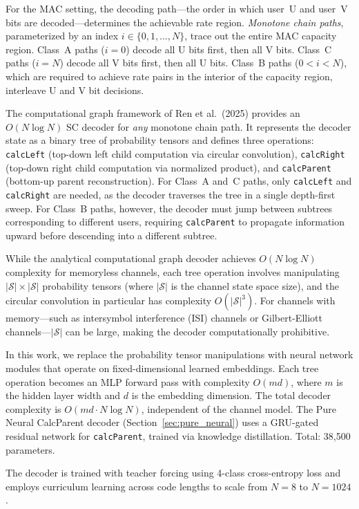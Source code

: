 \documentclass[11pt,a4paper]{article}
\begin{document}
For the MAC setting, the decoding path---the order in which user~U and user~V bits are decoded---determines the achievable rate region. \emph{Monotone chain paths}, parameterized by an index $i \in \{0, 1, \ldots, N\}$, trace out the entire MAC capacity region. Class~A paths ($i = 0$) decode all U bits first, then all V bits. Class~C paths ($i = N$) decode all V bits first, then all U bits. Class~B paths ($0 < i < N$), which are required to achieve rate pairs in the interior of the capacity region, interleave U and V bit decisions.

The computational graph framework of Ren et al.\ (2025) provides an $O(N \log N)$ SC decoder for \emph{any} monotone chain path. It represents the decoder state as a binary tree of probability tensors and defines three operations: \texttt{calcLeft} (top-down left child computation via circular convolution), \texttt{calcRight} (top-down right child computation via normalized product), and \texttt{calcParent} (bottom-up parent reconstruction). For Class~A and~C paths, only \texttt{calcLeft} and \texttt{calcRight} are needed, as the decoder traverses the tree in a single depth-first sweep. For Class~B paths, however, the decoder must jump between subtrees corresponding to different users, requiring \texttt{calcParent} to propagate information upward before descending into a different subtree.

While the analytical computational graph decoder achieves $O(N \log N)$ complexity for memoryless channels, each tree operation involves manipulating $|\mathcal{S}| \times |\mathcal{S}|$ probability tensors (where $|\mathcal{S}|$ is the channel state space size), and the circular convolution in particular has complexity $O(|\mathcal{S}|^3)$. For channels with memory---such as intersymbol interference (ISI) channels or Gilbert-Elliott channels---$|\mathcal{S}|$ can be large, making the decoder computationally prohibitive.

In this work, we replace the probability tensor manipulations with neural network modules that operate on fixed-dimensional learned embeddings. Each tree operation becomes an MLP forward pass with complexity $O(md)$, where $m$ is the hidden layer width and $d$ is the embedding dimension. The total decoder complexity is $O(md \cdot N \log N)$, independent of the channel model. The Pure Neural CalcParent decoder (Section~\ref{sec:pure_neural}) uses a GRU-gated residual network for \texttt{calcParent}, trained via knowledge distillation. Total: 38,500 parameters.

The decoder is trained with teacher forcing using 4-class cross-entropy loss and employs curriculum learning across code lengths to scale from $N = 8$ to $N = 1024$.
\end{document}
